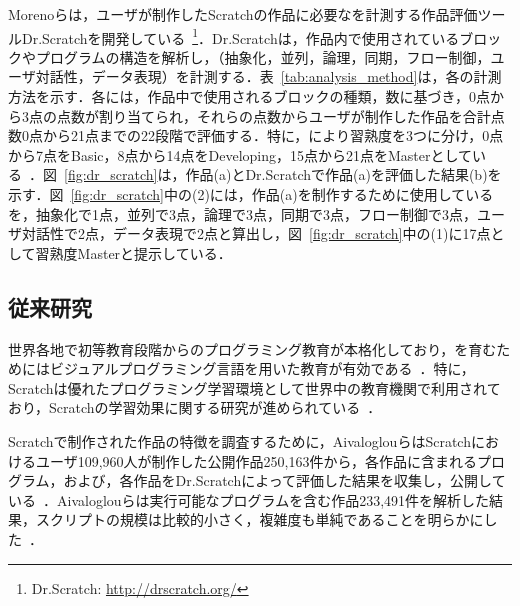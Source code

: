 \documentclass[submit]{ipsj}
\begin{document}
Morenoらは，ユーザが制作したScratchの作品に必要な\textcolor{red}{}を計測する作品評価ツールDr.Scratchを開発している~\cite{Moreno_2015}\footnote{Dr.Scratch: \url{http://drscratch.org/}}．Dr.Scratchは，作品内で使用されているブロックやプログラムの構造を解析し，\textcolor{red}{}（抽象化，並列，論理，同期，フロー制御，ユーザ対話性，データ表現）を計測する．表~\ref{tab:analysis_method}は，各\textcolor{red}{}の計測方法を示す．各\textcolor{red}{}には，作品中で使用されるブロックの種類，数に基づき，0点から3点の点数が割り当てられ，それら\textcolor{red}{}の点数からユーザが制作した作品を合計点数0点から21点までの22段階\textcolor{red}{}で評価する．特に，\textcolor{red}{}により習熟度を3つに分け，0点から7点をBasic，8点から14点をDeveloping，15点から21点をMasterとしている~\cite{Moreno_2015_analyze}．図~\ref{fig:dr_scratch}は，作品(a)とDr.Scratchで作品(a)を評価した結果(b)を示す．図~\ref{fig:dr_scratch}中の(2)には，作品(a)を制作するために使用している\textcolor{red}{}を，抽象化で1点，並列で3点，論理で3点，同期で3点，フロー制御で3点，ユーザ対話性で2点，データ表現で2点と算出し，図~\ref{fig:dr_scratch}中の(1)に\textcolor{red}{}17点として習熟度Masterと提示している．\textcolor{red}{}


\subsection{従来研究}
世界各地で初等教育段階からのプログラミング教育が本格化しており，\textcolor{red}{}を育むためにはビジュアルプログラミング言語を用いた教育が有効である~\cite{杉浦_2008}．特に，Scratchは優れたプログラミング学習環境として世界中の教育機関で利用されており，Scratchの学習効果に関する研究が進められている~\cite{Yang_2015}\cite{Aivaloglou_2017}\cite{Robles_2017}\cite{Troiano_2019}\cite{Troiano_2020}．

Scratchで制作された作品の特徴を調査するために，AivaloglouらはScratchにおけるユーザ109,960人が制作した公開作品250,163件から，各作品に含まれるプログラム，および，各作品をDr.Scratchによって評価した結果を収集し，公開している~\cite{Aivaloglou_2017}．Aivaloglouらは実行可能なプログラムを含む作品233,491件を解析した結果，スクリプトの規模は比較的小さく，複雑度も単純であることを明らかにした~\cite{Aivaloglou_2016}．
\end{document}
